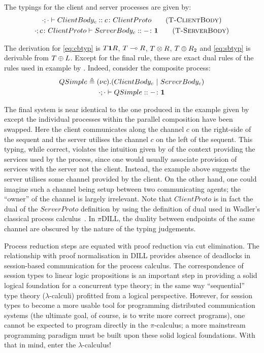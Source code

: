 \documentclass{mpaper}
\begin{document}
\begin{samepage}
The typings for the client and server processes are given by:
\begin{gather*}
\tsequent{\cdot}{\cdot}{ClientBody_c}{\typedid{c}{ClientProto}}
\tag{\mkTrule{ClientBody}} \label{eq:cbtyp}
\\ \tsequent{\cdot}{\typedid{c}{ClientProto}}{ServerBody_c}{\typedid{-}{\1}}
\tag{\mkTrule{ServerBody}} \label{eq:sbtyp}
\end{gather*}
\end{samepage}

The derivation for \eqref{eq:cbtyp} is $T\mathbf{1} R$, ${T}\multimap{R}$, ${T}\otimes{R}$,
${T}\oplus{R_2}$ and \eqref{eq:sbtyp} is derivable from
${T}\oplus{L}$. Except for the final rule, these are exact dual rules of the
rules used in example by \citeauthor{Caires:2010:STI}. Indeed, consider the
composite process:
\begin{gather*}
{QSimple}\triangleq{(\nu{c}).({ClientBody_c}~|~{ServerBody_c})}\\
{\cdot};{\cdot}\vdash{QSimple}::{{-}\colon{\mathbf{1}}}
\end{gather*}

The final system is near identical to the one produced in the example given by
\citeauthor{Caires:2010:STI} except the individual processes within the
parallel composition have been swapped. Here the client communicates along the
channel $c$ on the right-side of the sequent and the server utilises the
channel $c$ on the left of the sequent. This typing, while correct, violates
the intuition given by \citeauthor{Caires:2010:STI} of the context providing
the services used by the process, since one would usually associate provision
of services with the server not the client. Instead, the example above
suggests the server utilises some channel provided by the client. On the other
hand, one could imagine such a channel being setup between two communicating
agents; the ``owner'' of the channel is largely irrelevant. Note that
$ClientProto$ is in fact the dual of the $ServerProto$ definition by
\citeauthor{Caires:2010:STI} using the definition of dual used in Wadler's
classical process calculus~\cite{Wadler:2014}. In $\pi$DILL, the duality
between endpoints of the same channel are obscured by the nature of the typing
judgements.

Process reduction steps are equated with proof reduction via cut
elimination. The relationship with proof normalisation in DILL provides
absence of deadlocks in session-based communication for the process
calculus. The correspondence of session types to linear logic propositions is
an important step in providing a solid logical foundation for a concurrent
type theory; in the same way ``sequential'' type theory ($\lambda$-calculi)
profitted from a logical perspective. However, for session types to become a
more usable tool for programming distributed communication systems (the
ultimate goal, of course, is to write more correct programs), one cannot be
expected to program directly in the $\pi$-calculus; a more mainstream
programming paradigm must be built upon these solid logical foundations. With
that in mind, enter the $\lambda$-calculus!
\end{document}
